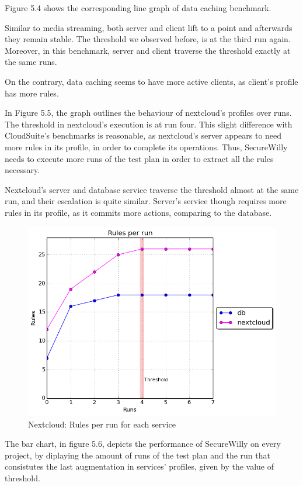 Figure 5.4 shows the corresponding line graph of data caching benchmark.

Similar to media streaming, both server and client lift to a point and afterwards they remain stable. The threshold we observed before, is at the third run again. Moreover, in this benchmark, server and client traverse the threshold exactly at the same runs.

On the contrary, data caching seems to have more active clients, as client's profile has more rules.

In Figure 5.5, the graph outlines the behaviour of nextcloud's profiles over runs. The threshold in nextcloud's execution is at run four. This slight difference with CloudSuite's benchmarks is reasonable, as nextcloud's server appears to need more rules in its profile, in order to complete its operations. Thus, SecureWilly needs to execute more runs of the test plan in order to extract all the rules necessary.

Nextcloud's server and database service traverse the threshold almost at the same run, and their escalation is quite similar. Server's service though requires more rules in its profile, as it commits more actions, comparing to the database.

\begin{figure}[h!]
  \centering
   \includegraphics[width=0.75\linewidth]{../figures/nextcloud/rulesthreshold.png}
   \caption{Nextcloud: Rules per run for each service}
\end{figure}
\hfill\break

The bar chart, in figure 5.6, depicts the performance of SecureWilly on every project, by diplaying the amount of runs of the test plan and the run that consistutes the last augmentation in services' profiles, given by the value of threshold.

